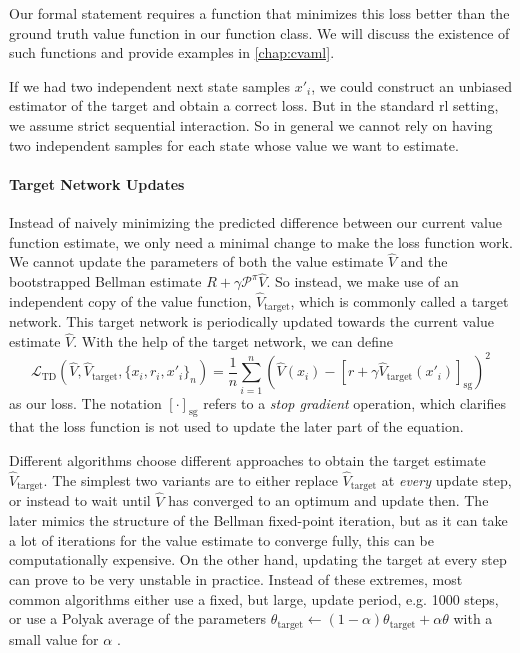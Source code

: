Our formal statement requires a function that minimizes this loss better than the ground truth value function in our function class.
We will discuss the existence of such functions and provide examples in \autoref{chap:cvaml}.

If we had two independent next state samples $x'_i$, we could construct an unbiased estimator of the target and obtain a correct loss.
But in the standard \ac{rl} setting, we assume strict sequential interaction.
So in general we cannot rely on having two independent samples for each state whose value we want to estimate.

\paragraph{Target Network Updates}

Instead of naively minimizing the predicted difference between our current value function estimate, we only need a minimal change to make the loss function work.
We cannot update the parameters of both the value estimate $\hat{V}$ and the bootstrapped Bellman estimate $R + \gamma \mathcal{P}^\pi \hat{V}$.
So instead, we make use of an independent copy of the value function, $\hat{V}_\mathrm{target}$, which is commonly called a target network. 
This target network is periodically updated towards the current value estimate $\hat{V}$.
With the help of the target network, we can define
\[
    \mathcal{L}_\mathrm{TD}\left(\hat{V}, \hat{V}_\mathrm{target}, \{x_i, r_i, x'_i\}_{n}\right) = \frac{1}{n} \sum_{i=1}^n \left(\hat{V}(x_i) - \left[r + \gamma \hat{V}_\mathrm{target}(x'_i)\right]_\mathrm{sg}\right)^2
\]
as our loss.
The notation $[\cdot]_\mathrm{sg}$ refers to a \emph{stop gradient} operation, which clarifies that the loss function is not used to update the later part of the equation.

Different algorithms choose different approaches to obtain the target estimate $\hat{V}_\mathrm{target}$.
The simplest two variants are to either replace $\hat{V}_\mathrm{target}$ at \emph{every} update step, or instead to wait until $\hat{V}$ has converged to an optimum and update then.
The later mimics the structure of the Bellman fixed-point iteration, but as it can take a lot of iterations for the value estimate to converge fully, this can be computationally expensive.
On the other hand, updating the target at every step can prove to be very unstable in practice.
Instead of these extremes, most common algorithms either use a fixed, but large, update period, e.g. 1000 steps, \parencite{dqn} or use a Polyak average of the parameters $\theta_\mathrm{target} \leftarrow (1 - \alpha) \theta_\mathrm{target} + \alpha \theta$ with a small value for $\alpha$ \parencite{td3}.

